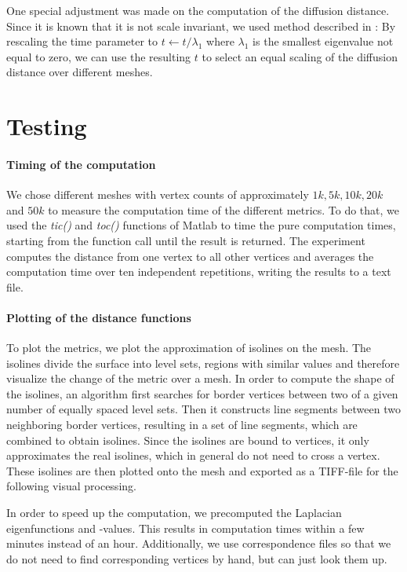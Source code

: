 One special adjustment was made on the computation of the diffusion distance.
Since it is known that it is not scale invariant, we used method described in \cite{lipman2010biharmonic}:
By rescaling the time parameter to $t \leftarrow t/\lambda_1$ where $\lambda_1$ is the smallest eigenvalue not equal to zero, we can use the resulting $t$ to select an equal scaling of the diffusion distance over different meshes.

\section{Testing}
\paragraph{Timing of the computation}
We chose different meshes with vertex counts of approximately $1k, 5k, 10k, 20k$ and $50k$ to measure the computation time of the different metrics.
To do that, we used the \textit{tic()} and \textit{toc()} functions of Matlab to time the pure computation times, starting from the function call until the result is returned.
The experiment computes the distance from one vertex to all other vertices and averages the computation time over ten independent repetitions, writing the results to a text file.

\paragraph{Plotting of the distance functions}
To plot the metrics, we plot the approximation of isolines on the mesh.
The isolines divide the surface into level sets, regions with similar values and therefore visualize the change of the metric over a mesh.
In order to compute the shape of the isolines, an algorithm first searches for border vertices between two of a given number of equally spaced level sets.
Then it constructs line segments between two neighboring border vertices, resulting in a set of line segments, which are combined to obtain isolines.
Since the isolines are bound to vertices, it only approximates the real isolines, which in general do not need to cross a vertex.
These isolines are then plotted onto the mesh and exported as a TIFF-file for the following visual processing.

In order to speed up the computation, we precomputed the Laplacian eigenfunctions and -values.
This results in computation times within a few minutes instead of an hour.
Additionally, we use correspondence files so that we do not need to find corresponding vertices by hand, but can just look them up.

